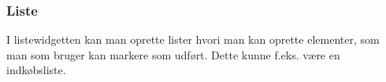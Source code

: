 \subsubsection{Liste}

I listewidgetten kan man oprette lister hvori man kan oprette elementer, som man som bruger kan markere som udført. Dette kunne f.eks. være en indkøbsliste.\newline





